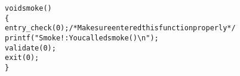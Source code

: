 \begin{alltt}
void smoke()
\verb:{:
    entry_check(0);  /* Make sure entered this function properly */
    printf("Smoke!: You called smoke()\verb:\n:");
    validate(0);
    exit(0);
\verb:}:
\end{alltt}
